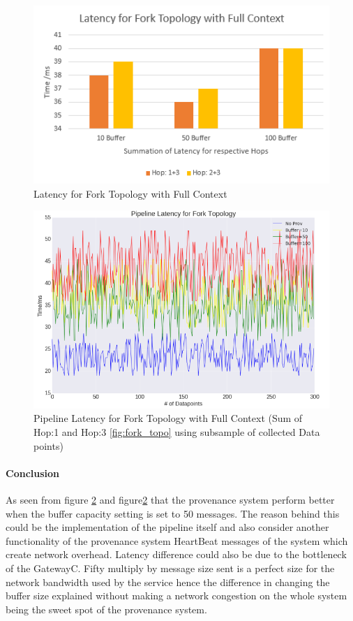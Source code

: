 \begin{figure}[H]
	\center
	\includegraphics[width=\textwidth]{figures/buffer-fork.PNG}
	\caption{Latency for Fork Topology with Full Context}
	\label{fig:forktopo_latency_buffer}
\end{figure}

\begin{figure}[H]
	\center
	\includegraphics[width=\textwidth]{figures/pipeline_buffer.png}
	\caption{Pipeline Latency for Fork Topology with Full Context (Sum of Hop:1 and Hop:3 \ref{fig:fork_topo} using subsample of collected Data points)}
	\label{fig:forktopo_latency_buffer}
\end{figure}


\paragraph*{Conclusion}
As seen from figure \ref{fig:forktopo_latency_buffer} and figure\ref{fig:forktopo_latency_buffer} that the provenance system perform better when the buffer capacity setting is set to 50 messages. The reason behind this could be the implementation of the pipeline itself and also consider another functionality of the provenance system HeartBeat messages of the system which create network overhead. Latency difference could also be due to the bottleneck of the GatewayC. Fifty multiply by message size sent is a perfect size for the network bandwidth used by the service hence the difference in changing the buffer size explained without making a network congestion on the whole system being the sweet spot of the provenance system.


